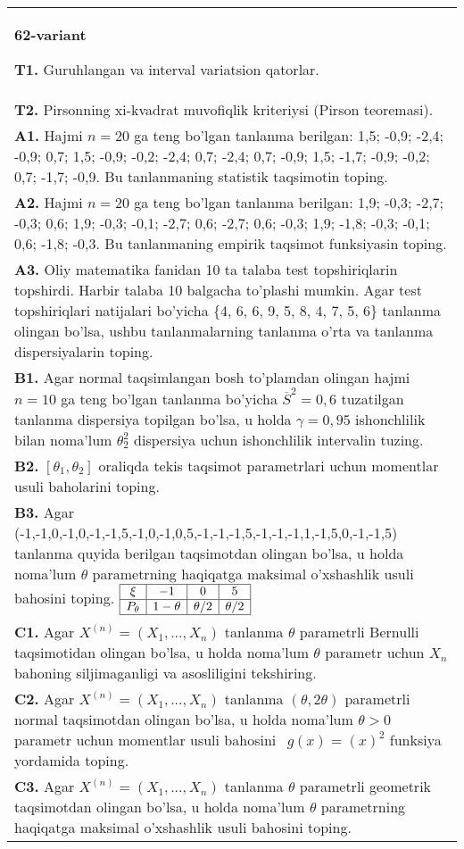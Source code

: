 \documentclass{article}
\begin{document}
\begin{tabular}{m{17cm}}
\textbf{62-variant}
\newline

\textbf{T1.} 
Guruhlangan va interval variatsion qatorlar.
\\
\textbf{T2.} 
Pirsonning xi-kvadrat muvofiqlik kriteriysi (Pirson teoremasi).
\\
\textbf{A1.} 
Hajmi \(n = 20\) ga teng bo'lgan tanlanma berilgan: 1,5; -0,9; -2,4; -0,9; 0,7; 1,5; -0,9; -0,2; -2,4; 0,7; -2,4; 0,7; -0,9; 1,5; -1,7; -0,9; -0,2; 0,7; -1,7; -0,9. Bu tanlanmaning statistik taqsimotin toping.
\\
\textbf{A2.} 
Hajmi \(n = 20\) ga teng bo'lgan tanlanma berilgan: 1,9; -0,3; -2,7; -0,3; 0,6; 1,9; -0,3; -0,1; -2,7; 0,6; -2,7; 0,6; -0,3; 1,9; -1,8; -0,3; -0,1; 0,6; -1,8; -0,3. Bu tanlanmaning empirik taqsimot funksiyasin toping.
\\
\textbf{A3.} 
Oliy matematika fanidan 10 ta talaba test topshiriqlarin topshirdi. Harbir talaba 10 balgacha to'plashi mumkin. Agar test topshiriqlari natijalari bo'yicha \{4, 6, 6, 9, 5, 8, 4, 7, 5, 6\} tanlanma olingan bo'lsa, ushbu tanlanmalarning tanlanma o'rta va tanlanma dispersiyalarin toping.
\\
\textbf{B1.} 
Agar normal taqsimlangan bosh to'plamdan olingan hajmi \(n = 10\) ga teng bo'lgan tanlanma bo'yicha \({\overline{S}}^{2} = 0,6\) tuzatilgan tanlanma dispersiya topilgan bo'lsa, u holda \(\gamma = 0,95\) ishonchlilik bilan noma'lum \(\theta_{2}^{2}\) dispersiya uchun ishonchlilik intervalin tuzing.
\\
\textbf{B2.} 
\(\left\lbrack \theta_{1},\theta_{2} \right\rbrack\) oraliqda tekis taqsimot parametrlari uchun momentlar usuli baholarini toping.
\\
\textbf{B3.} 
Agar (-1,-1,0,-1,0,-1,-1,5,-1,0,-1,0,5,-1,-1,-1,5,-1,-1,-1,1,-1,5,0,-1,-1,5) tanlanma quyida berilgan taqsimotdan olingan bo'lsa, u holda noma'lum \(\theta\) parametrning haqiqatga maksimal o'xshashlik usuli bahosini toping.
$\begin{array}{|c|c|c|c|}
    \hline
    \xi & - 1 & 0 & 5\\
    \hline
    P_{\theta} & 1 - \theta & \theta/2 & \theta/2 \\
    \hline
\end{array}$
\\
\textbf{C1.} 
Agar \(X^{(n)} = \left( X_{1},...,X_{n} \right)\) tanlanma \(\theta\) parametrli Bernulli taqsimotidan olingan bo'lsa, u holda noma'lum \(\theta\) parametr uchun \(X_{n}\) bahoning siljimaganligi va asosliligini tekshiring.
\\
\textbf{C2.} 
Agar \(X^{(n)} = \left( X_{1},...,X_{n} \right)\) tanlanma \((\theta,2\theta)\) parametrli normal taqsimotdan olingan bo'lsa, u holda noma'lum \(\theta > 0\) parametr uchun momentlar usuli bahosini \(\ \ g(x) = (x)^{2}\) funksiya yordamida toping.
\\
\textbf{C3.} 
Agar \(X^{(n)} = \left( X_{1},...,X_{n} \right)\) tanlanma \(\theta\) parametrli geometrik taqsimotdan olingan bo'lsa, u holda noma'lum \(\theta\) parametrning haqiqatga maksimal o'xshashlik usuli bahosini toping.
\\

\end{tabular}
\end{document}
